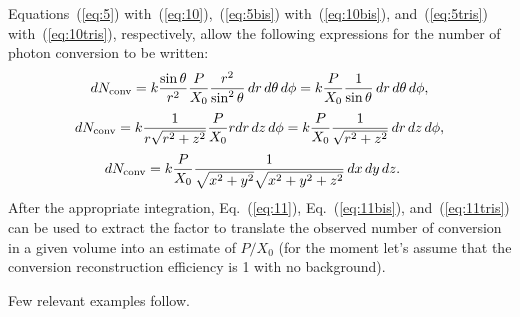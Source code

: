 Equations~(\ref{eq:5}) with~(\ref{eq:10}),~(\ref{eq:5bis})
with~(\ref{eq:10bis}), and~(\ref{eq:5tris}) with~(\ref{eq:10tris}),
respectively, allow the following expressions for the number of photon
conversion to be written:
\begin{equation}
d N_{\rm conv} = k \frac{\sin \theta}{r^2} 
\frac{P}{X_0} \frac{r^2}{\sin^2\theta}\, dr\, d\theta\, d\phi = k
\frac{P}{X_0} \frac{1}{\sin\theta}\, dr\, d\theta\, d\phi ,
\label{eq:11}
\end{equation}
\begin{equation}
d N_{\rm conv} = k \frac{1}{r\sqrt{r^2+z^2}} 
\frac{P}{X_0} r dr\, dz\, d\phi = k
\frac{P}{X_0} \frac{1}{\sqrt{r^2+z^2}}\, dr\, dz\, d\phi ,
\label{eq:11bis}
\end{equation}
\begin{equation}
\begin{split}
d N_{\rm conv} & = k \frac{P}{X_0} \frac{1}{\sqrt{x^2+y^2}\sqrt{x^2+y^2+z^2}} \,dx\,dy\,dz .
\end{split}
\label{eq:11tris}
\end{equation}
After the appropriate integration, Eq.~(\ref{eq:11}),
Eq.~(\ref{eq:11bis}), and~(\ref{eq:11tris}) can be used to extract the
factor to translate the observed number of conversion in a given 
volume into an estimate of $P/X_0$ (for the moment let's assume that
the conversion reconstruction efficiency is 1 with no background).

Few relevant examples follow.

